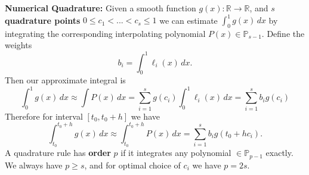 \documentclass[10pt,a4paper]{article}
\newcommand{\R}{\mathbb{R}}
\renewcommand{\P}{\mathbb{P}}
\begin{document}
\begin{multicols*}{2}
\textbf{Numerical Quadrature:} Given a smooth function $g(x) : \R \to \R$, and $s$ \textbf{quadrature points} $0 \leq c_1 < ... < c_s \leq 1$ we can estimate $\int_0^1 g(x) \,dx$ by integrating the corresponding interpolating polynomial $P(x) \in \P_{s - 1}$. Define the weights \[
b_i = \int_0^1 \ell_i(x)\,dx.    
\]
Then our approximate integral is
\[
\int_0^1 g(x)\,dx \approx \int P(x)\,dx = \sum_{i=1}^s g(c_i) \int_0^1\ell_i(x)\,dx = \sum_{i=1}^s b_i g(c_i)
\]
Therefore for interval $[t_0, t_0 + h]$ we have
\[
    \int_{t_0}^{t_0 + h} g(x)\,dx \approx \int_{t_0}^{t_0 + h} P(x) \, dx = \sum_{i=1}^s b_i g(t_0 + hc_i).
\]
A quadrature rule has \textbf{order} $p$ if it integrates any polynomial $\in \P_{p-1}$ exactly. We always have $p \geq s$, and for optimal choice of $c_i$ we have $p = 2s$.

\end{multicols*}
\end{document}

